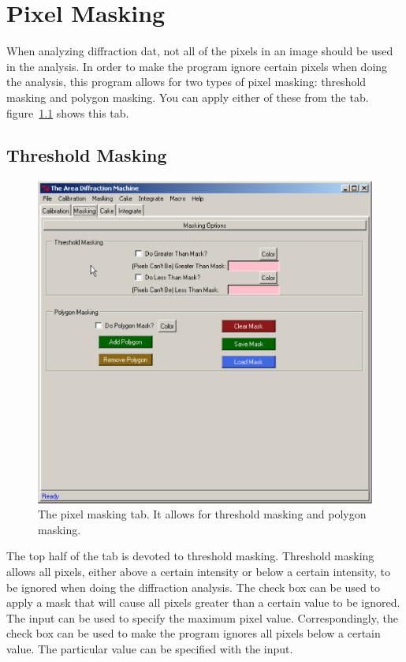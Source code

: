 \chapter{Pixel Masking}\label{pixel_masking}

When analyzing diffraction dat, not all of the pixels in 
an image should be used in the analysis. In order to make 
the program ignore certain pixels when doing the analysis, 
this program allows for two types of pixel masking:
threshold masking and polygon masking. You can 
apply either of these from the 
 tab. figure~\ref{masking_tab}
shows this tab. 

\section{Threshold Masking}

\begin{figure}
    \centering
    \includegraphics[scale=.75]{figures/masking_tab.eps}
    \caption{The pixel masking tab. It allows for threshold 
    masking and polygon masking.} 
    \label{masking_tab}
\end{figure}

The top half of the  tab is devoted to 
threshold masking. Threshold masking allows all pixels, 
either above a certain intensity or below a certain 
intensity, to be ignored when doing the diffraction 
analysis. The  check box can 
be used to apply a mask that will cause all pixels 
greater than a certain value to be ignored.
The  input 
can be used to specify the maximum pixel value.
Correspondingly, the  check box
can be used to make the program ignores all
pixels below a certain value. The particular value can 
be specified with the  input. 

